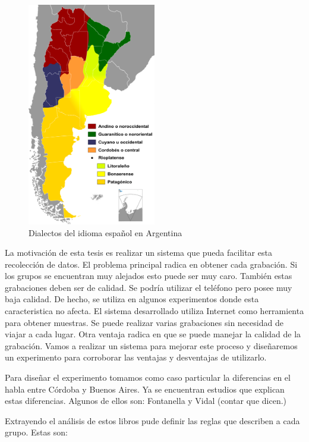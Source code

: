 \documentclass[11pt,a4paper,twoside]{tesis}
\begin{document}
\begin{figure}[h!]
    \includegraphics[width=0.5\textwidth]{Dialectos_del_idioma_espanol_en_Argentina} 
    \caption{Dialectos del idioma español en Argentina}
\end{figure}

La motivación de esta tesis es realizar un sistema que pueda facilitar esta recolección de datos. El problema principal radica en obtener cada grabación. Si los grupos se encuentran muy alejados esto puede ser muy caro. También estas grabaciones deben ser de calidad. Se podría utilizar el teléfono pero posee muy baja calidad. De hecho, se utiliza en algunos experimentos donde esta caracteristica no afecta. El sistema desarrollado utiliza Internet como herramienta para obtener muestras. Se puede realizar varias grabaciones sin necesidad de viajar a cada lugar. Otra ventaja radica en que se puede manejar la calidad de la grabación. Vamos a realizar un sistema para mejorar este proceso y diseñaremos un experimento para corroborar las ventajas y desventajas de utilizarlo. 

Para diseñar el experimento tomamos como caso particular la diferencias en el habla entre Córdoba y Buenos Aires. Ya se encuentran estudios que explican estas diferencias. Algunos de ellos son: Fontanella y Vidal (contar que dicen.)

Extrayendo el análisis de estos libros pude definir las reglas que describen a cada grupo. Estas son: 
\end{document}

